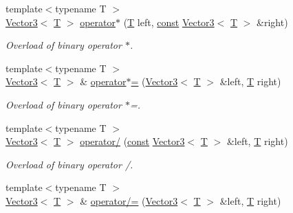\begin{DoxyCompactItemize}
{\footnotesize template$<$typename T $>$ }\\\hyperlink{classsf_1_1_vector3}{Vector3}$<$ \hyperlink{curses_8priv_8h_a5ef253115820acf7d27f3c5c3b02a0f0}{T} $>$ \hyperlink{classsf_1_1_vector3_aa6f2b0d9f79c1b9774759b7087affbb1}{operator$\ast$} (\hyperlink{curses_8priv_8h_a5ef253115820acf7d27f3c5c3b02a0f0}{T} left, \hyperlink{term__entry_8h_a57bd63ce7f9a353488880e3de6692d5a}{const} \hyperlink{classsf_1_1_vector3}{Vector3}$<$ \hyperlink{curses_8priv_8h_a5ef253115820acf7d27f3c5c3b02a0f0}{T} $>$ \&right)
\begin{DoxyCompactList}\small\item\em Overload of binary operator $\ast$. \end{DoxyCompactList}\item 
{\footnotesize template$<$typename T $>$ }\\\hyperlink{classsf_1_1_vector3}{Vector3}$<$ \hyperlink{curses_8priv_8h_a5ef253115820acf7d27f3c5c3b02a0f0}{T} $>$ \& \hyperlink{classsf_1_1_vector3_ad5fb972775ce8ab58cd9670789e806a7}{operator$\ast$=} (\hyperlink{classsf_1_1_vector3}{Vector3}$<$ \hyperlink{curses_8priv_8h_a5ef253115820acf7d27f3c5c3b02a0f0}{T} $>$ \&left, \hyperlink{curses_8priv_8h_a5ef253115820acf7d27f3c5c3b02a0f0}{T} right)
\begin{DoxyCompactList}\small\item\em Overload of binary operator $\ast$=. \end{DoxyCompactList}\item 
{\footnotesize template$<$typename T $>$ }\\\hyperlink{classsf_1_1_vector3}{Vector3}$<$ \hyperlink{curses_8priv_8h_a5ef253115820acf7d27f3c5c3b02a0f0}{T} $>$ \hyperlink{classsf_1_1_vector3_ad4ba4a83de236ddeb92a7b759187e90d}{operator/} (\hyperlink{term__entry_8h_a57bd63ce7f9a353488880e3de6692d5a}{const} \hyperlink{classsf_1_1_vector3}{Vector3}$<$ \hyperlink{curses_8priv_8h_a5ef253115820acf7d27f3c5c3b02a0f0}{T} $>$ \&left, \hyperlink{curses_8priv_8h_a5ef253115820acf7d27f3c5c3b02a0f0}{T} right)
\begin{DoxyCompactList}\small\item\em Overload of binary operator /. \end{DoxyCompactList}\item 
{\footnotesize template$<$typename T $>$ }\\\hyperlink{classsf_1_1_vector3}{Vector3}$<$ \hyperlink{curses_8priv_8h_a5ef253115820acf7d27f3c5c3b02a0f0}{T} $>$ \& \hyperlink{classsf_1_1_vector3_a8995a700f9dffccc6dddb3696ae17b64}{operator/=} (\hyperlink{classsf_1_1_vector3}{Vector3}$<$ \hyperlink{curses_8priv_8h_a5ef253115820acf7d27f3c5c3b02a0f0}{T} $>$ \&left, \hyperlink{curses_8priv_8h_a5ef253115820acf7d27f3c5c3b02a0f0}{T} right)

\end{DoxyCompactItemize}
